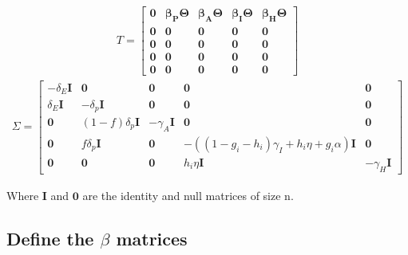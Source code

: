 \documentclass{article}
\begin{document}
\begin{gather}
 T =
  \begin{bmatrix}
   \boldsymbol{0} & \boldsymbol{\beta_P} \boldsymbol{\Theta} & 
   \boldsymbol{\beta_A} \boldsymbol{\Theta} &
   \boldsymbol{\beta_I} \boldsymbol{\Theta} &
   \boldsymbol{\beta_H} \boldsymbol{\Theta} \\
   \boldsymbol{0} & \boldsymbol{0} & \boldsymbol{0} & \boldsymbol{0} & \boldsymbol{0} \\
   \boldsymbol{0} & \boldsymbol{0} & \boldsymbol{0} & \boldsymbol{0} & \boldsymbol{0} \\
   \boldsymbol{0} & \boldsymbol{0} & \boldsymbol{0} & \boldsymbol{0} & \boldsymbol{0} \\
   \boldsymbol{0} & \boldsymbol{0} & \boldsymbol{0} & \boldsymbol{0} & \boldsymbol{0}
   \end{bmatrix}
\end{gather}
\begin{gather}
 \Sigma =
  \begin{bmatrix}
   - \delta_E \boldsymbol{I} & \boldsymbol{0} & \boldsymbol{0} & \boldsymbol{0} & \boldsymbol{0} \\
   \delta_E \boldsymbol{I}& -\delta_p \boldsymbol{I} & \boldsymbol{0} & \boldsymbol{0} & \boldsymbol{0} \\
   \boldsymbol{0} & (1-f) \delta_p \boldsymbol{I} & -\gamma_A \boldsymbol{I} & \boldsymbol{0} & \boldsymbol{0} \\
   \boldsymbol{0} & f \delta_p \boldsymbol{I} & \boldsymbol{0} & - ((1-g_i-h_i) \gamma_{I} + h_i \eta + g_i \alpha) \boldsymbol{I} & \boldsymbol{0} \\
   \boldsymbol{0} & \boldsymbol{0} & \boldsymbol{0} & h_i \eta \boldsymbol{I} & -\gamma_H \boldsymbol{I}
   \end{bmatrix}
\end{gather}

Where $\boldsymbol{I}$ and $\boldsymbol{0}$ are the identity and null matrices of size n. \\

\subsection*{Define the $\beta$ matrices}
\end{document}
